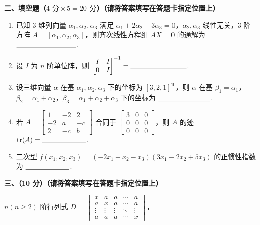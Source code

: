 \documentclass[a4paper,11pt]{ctexart}
\newcommand{\tr}{\operatorname{tr}}
\newcommand{\T}{\mathrm{T}}
\newcommand{\blank}[1][2.8cm]{\underline{\hspace{#1}}}
\begin{document}
\vspace{0.9em}

\textbf{二、填空题（$4\text{ 分}\times 5 = 20\text{ 分}$）（请将答案填写在答题卡指定位置上）}

\begin{enumerate}[label=\arabic*., leftmargin=2em, itemsep=0.8em, topsep=0.6em]
  \item 已知 $3$ 维列向量 $\alpha_1, \alpha_2, \alpha_3$ 满足 $\alpha_1 + 2\alpha_2 + 3\alpha_3 = 0$，$\alpha_2, \alpha_3$ 线性无关，$3$ 阶方阵 $A = [\alpha_1, \alpha_2, \alpha_3]$，则齐次线性方程组 $AX = 0$ 的通解为 $\blank[3.0cm]$.

  \item 设 $I$ 为 $n$ 阶单位阵，则 $\begin{bmatrix} I & I \\ 0 & I \end{bmatrix}^{-1} = \blank[2.8cm]$.

  \item 设三维向量 $\alpha$ 在基 $\alpha_1, \alpha_2, \alpha_3$ 下的坐标为 $[3, 2, 1]^{\T}$，则 $\alpha$ 在基 $\beta_1 = \alpha_1$，$\beta_2 = \alpha_1 + \alpha_2$，$\beta_3 = \alpha_1 + \alpha_2 + \alpha_3$ 下的坐标为 $\blank[2.6cm]$.

  \item 若 $A = \begin{bmatrix} 1 & -2 & 2 \\ -2 & a & -c \\ 2 & -c & b \end{bmatrix}$ 合同于 $\begin{bmatrix} 3 & 0 & 0 \\ 0 & 0 & 0 \\ 0 & 0 & 0 \end{bmatrix}$，则 $A$ 的迹 $\tr(A) = \blank[2.2cm]$.

  \item 二次型 $f(x_1, x_2, x_3) = (-2x_1 + x_2 - x_3)(3x_1 - 2x_2 + 5x_3)$ 的正惯性指数为 $\blank[2.2cm]$.
\end{enumerate}

\newpage

\textbf{三、（10 分）（请将答案填写在答题卡指定位置上）}

$n(n \ge 2)$ 阶行列式 $D = \begin{vmatrix}
  x & a & a & \cdots & a \\
  a & x & a & \cdots & a \\
  \vdots & \vdots & \vdots & \ddots & \vdots \\
  a & a & a & \cdots & x
\end{vmatrix}$，
\end{document}
